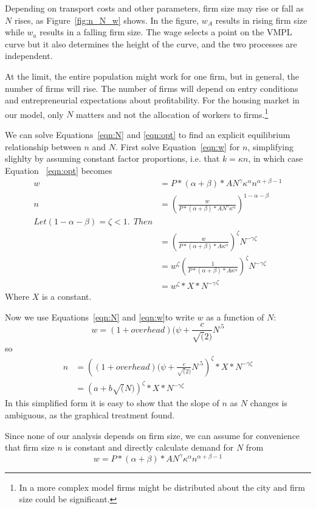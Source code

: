 Depending on transport costs and other parameters, firm size may rise or fall as $N$ rises, as Figure~\ref{fig:n_N_w} shows. In the figure, $w_A$ results in rising firm size while $w_a$ results in a falling firm size. The wage selects a point on the VMPL curve but it also determines the  height of the curve, and the two processes are independent.

At the limit, the entire population might work for one firm, but in general, the number of firms will rise. The number of firms will depend on entry conditions and entrepreneurial expectations about profitability. For the housing market in our model, only $N$ matters and not the allocation of workers to firms.\footnote{In a more complex model firms might be distributed about the city and firm size could be significant.}

We can solve Equations~\ref{eqn:N} and \ref{eqn:opt} to find an explicit equilibrium relationship between $n$ and $N$. First solve Equation~\ref{eqn:w} for $n$, simplifying slighlty by assuming constant factor proportions, i.e. that  $k=\kappa n$, in which case Equation~ \ref{eqn:opt} becomes 
\begin{align}\label{eqn:opt1}
w   &= P*(\alpha+\beta)*AN^\gamma \kappa^\alpha n^{\alpha+\beta-1} \\   
n  &=\left(\frac{w}{P*(\alpha+\beta)*AN^\gamma \kappa^\alpha}\right)^{1-\alpha-\beta} \\
Let (1-\alpha-\beta) = \zeta <1.\ \ Then \\
    &=\left(\frac{w}{P*(\alpha+\beta)*A \kappa^\alpha}\right)^\zeta N^{-\gamma\zeta }\\
    &=w^\zeta\left(\frac{1}{P*(\alpha+\beta)*A \kappa^\alpha}\right)^\zeta N^{-\gamma\zeta }\\
    &=w^\zeta*X*{N^{-\gamma}}^\zeta
\end{align}
Where $X$ is a constant.

Now we use Equations~\ref{eqn:N} and \ref{eqn:w}to write $w$ as a function of $N$:
\[w=(1+overhead)(\psi+\frac{c}{\sqrt(2)}N^{.5}\]
so
\begin{align}
    n &= \left((1+overhead)(\psi+\frac{c}{\sqrt(2)}N^{.5}\right)^\zeta*X*N^{-\gamma\zeta }\\
  &= \left(a+b\sqrt(N)\right)^\zeta*X*N^{-\gamma\zeta }   
\end{align}
In this simplified form it is easy to show that the slope of $n$ as $N$ changes is ambiguous, as the graphical treatment found.

Since none of our analysis depends on firm size, we can assume for convenience that firm size $n$ is constant and directly calculate demand for $N$ from
\[w  = P*(\alpha+\beta)*AN^\gamma \kappa^\alpha n^{\alpha+\beta-1}  \]

